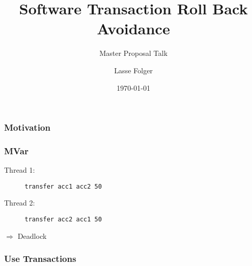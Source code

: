 \documentclass{beamer}
\author{Lasse Folger}
\title{\huge Software Transaction Roll Back Avoidance}
\subtitle{Master Proposal Talk}
\date{\today}
\begin{document}
  \begin{frame}[t,plain]
    \titlepage
  \end{frame}
  
  
  \begin{frame}[plain]
    \frametitle{Motivation}
    
  \end{frame}
  
  \begin{frame}[fragile]
    \frametitle{MVar}
    \fboxsep=0pt
    \noindent
    \begin{minipage}[t]{0.48\linewidth}
      Thread 1:
            \begin{figure}
       \begin{lstlisting}[frame=single]
transfer acc1 acc2 50
       \end{lstlisting}
      \end{figure}
\end{minipage}%
    \hfill%
    \begin{minipage}[t]{0.48\linewidth}
      Thread 2:      
      \begin{figure}
       \begin{lstlisting}[frame=single]
transfer acc2 acc1 50
       \end{lstlisting}
      \end{figure}
    \end{minipage}
    \vfill
    \pause
    $\Rightarrow$ Deadlock
\end{frame}
  
  \begin{frame}
    \frametitle{Use Transactions}
       
  \end{frame}
  
\end{document}
